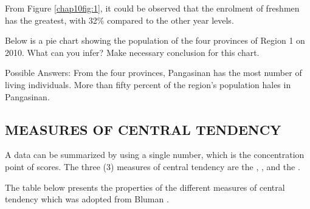 \begin{example}
From Figure \eqref{chap10fig:1}, it could be observed that the enrolment of freshmen has the
greatest, with 32\% compared to the other year levels.

\item Below is a pie chart showing the population of the four
provinces of Region 1 on 2010. What can you infer? Make necessary
conclusion for this chart.

\begin{center}
\label{chap10fig:2}
\end{center}

\Solution

Possible Answers: From the four provinces, Pangasinan has the most number of living
individuals. More than fifty percent of the region's population hales in Pangasinan.
\end{example}
\subsection*{MEASURES OF CENTRAL TENDENCY}
A data can be summarized by using a single number, which is the
concentration point of scores. The three (3) measures of central tendency are the
, , and the .

The table below presents the properties of the different measures of central tendency
which was adopted from Bluman \textcite{bulman}.

